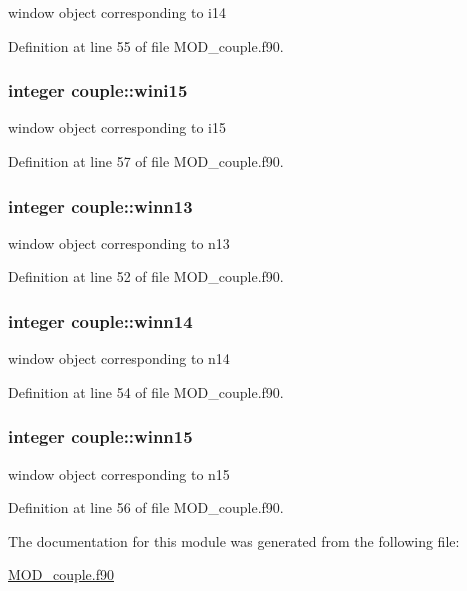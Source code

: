 window object corresponding to i14 



Definition at line 55 of file M\-O\-D\-\_\-couple.\-f90.

\hypertarget{classcouple_a7d69f95f16d5d8a96cb1ba53d1a49c3a}{
\subsubsection[{wini15}]{\setlength{\rightskip}{0pt plus 5cm}integer couple\-::wini15}}\label{classcouple_a7d69f95f16d5d8a96cb1ba53d1a49c3a}


window object corresponding to i15 



Definition at line 57 of file M\-O\-D\-\_\-couple.\-f90.

\hypertarget{classcouple_ab5821431c72ea00070b906b8cd377e74}{
\subsubsection[{winn13}]{\setlength{\rightskip}{0pt plus 5cm}integer couple\-::winn13}}\label{classcouple_ab5821431c72ea00070b906b8cd377e74}


window object corresponding to n13 



Definition at line 52 of file M\-O\-D\-\_\-couple.\-f90.

\hypertarget{classcouple_a71b4ea717f4034101cc98261cfcf2685}{
\subsubsection[{winn14}]{\setlength{\rightskip}{0pt plus 5cm}integer couple\-::winn14}}\label{classcouple_a71b4ea717f4034101cc98261cfcf2685}


window object corresponding to n14 



Definition at line 54 of file M\-O\-D\-\_\-couple.\-f90.

\hypertarget{classcouple_aa5f4412953b32839f1fe3000ab14125b}{
\subsubsection[{winn15}]{\setlength{\rightskip}{0pt plus 5cm}integer couple\-::winn15}}\label{classcouple_aa5f4412953b32839f1fe3000ab14125b}


window object corresponding to n15 



Definition at line 56 of file M\-O\-D\-\_\-couple.\-f90.



The documentation for this module was generated from the following file\-:\begin{DoxyCompactItemize}
\item 
\hyperlink{MOD__couple_8f90}{M\-O\-D\-\_\-couple.\-f90}\end{DoxyCompactItemize}
